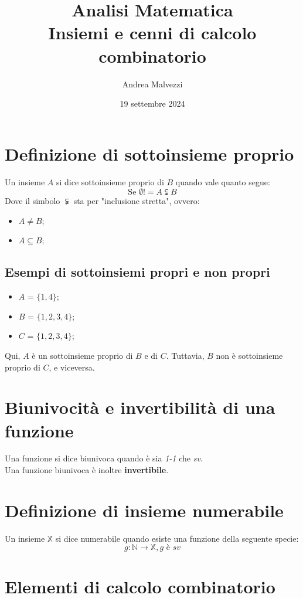 \documentclass[12pt]{article}
\title{\textbf{Analisi Matematica\\Insiemi e cenni di calcolo combinatorio}}
\date{19 settembre 2024}
\author{Andrea Malvezzi}
\begin{document}
\maketitle
\pagebreak
\tableofcontents
\pagebreak
\section{Definizione di sottoinsieme proprio}
Un insieme $A$ si dice sottoinsieme proprio di $B$ quando vale quanto segue:
\begin{equation}
    \text{Se } \emptyset != A \subsetneqq \label{eq:sottoinsieme_proprio}B
\end{equation}
Dove il simbolo $\subsetneqq$ sta per "inclusione stretta", ovvero:
\begin{itemize}
    \item $A \not= B$;
    \item $A \subseteq B$;
\end{itemize}
\subsection{Esempi di sottoinsiemi propri e non propri}
\begin{itemize}
    \item $A$ = $\{1, 4\}$;
    \item $B$ = $\{1, 2, 3, 4\}$;
    \item $C$ = $\{1, 2, 3, 4\}$;
\end{itemize}
Qui, $A$ è un sottoinsieme proprio di $B$ e di $C$. Tuttavia, $B$ non è sottoinsieme proprio di $C$, e viceversa.
\section{Biunivocità e invertibilità di una funzione}
Una funzione si dice biunivoca quando è sia \textit{1-1} che \textit{sv}.\\
Una funzione biunivoca è inoltre \textbf{invertibile}.
\section{Definizione di insieme numerabile}
Un insieme $\mathbb{X}$ si dice numerabile quando esiste una funzione della seguente specie:
\begin{equation}
    g: \mathbb{N} \rightarrow \mathbb{X}, \textit{g è sv} \label{eq:insieme_numerabile}
\end{equation}
\pagebreak
\section{Elementi di calcolo combinatorio}
\end{document}
